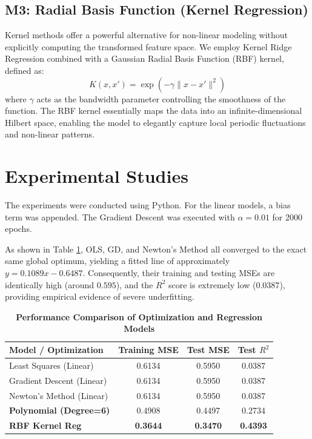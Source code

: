 \documentclass[12pt,a4paper]{article}
\begin{document}
\subsection*{M3: Radial Basis Function (Kernel Regression)}
Kernel methods offer a powerful alternative for non-linear modeling without explicitly computing the transformed feature space. We employ Kernel Ridge Regression combined with a Gaussian Radial Basis Function (RBF) kernel, defined as:
\begin{equation}
    K(x, x') = \exp\left(-\gamma \|x - x'\|^2\right)
\end{equation}
where $\gamma$ acts as the bandwidth parameter controlling the smoothness of the function. The RBF kernel essentially maps the data into an infinite-dimensional Hilbert space, enabling the model to elegantly capture local periodic fluctuations and non-linear patterns.

\section*{Experimental Studies}
The experiments were conducted using Python. For the linear models, a bias term was appended. The Gradient Descent was executed with $\alpha = 0.01$ for 2000 epochs. 

As shown in Table \ref{tab:1}, OLS, GD, and Newton's Method all converged to the exact same global optimum, yielding a fitted line of approximately $y = 0.1089x - 0.6487$. Consequently, their training and testing MSEs are identically high (around $0.595$), and the $R^2$ score is extremely low ($0.0387$), providing empirical evidence of severe underfitting.

\begin{table}[H] 
    \centering 
    \caption{\textbf{Performance Comparison of Optimization and Regression Models}} 
    \begin{tabular}{lccc} 
        \toprule 
        \textbf{Model / Optimization} & \textbf{Training MSE} & \textbf{Test MSE} & \textbf{Test $R^2$} \\
        \midrule 
        Least Squares (Linear) & 0.6134 & 0.5950 & 0.0387 \\
        Gradient Descent (Linear) & 0.6134 & 0.5950 & 0.0387 \\
        Newton's Method (Linear) & 0.6134 & 0.5950 & 0.0387 \\
        \textbf{Polynomial (Degree=6)} & 0.4908 & 0.4497 & 0.2734 \\
        \textbf{RBF Kernel Reg} & \textbf{0.3644} & \textbf{0.3470} & \textbf{0.4393} \\
        \bottomrule 
    \end{tabular}
    \label{tab:1} 
\end{table}
\end{document}
